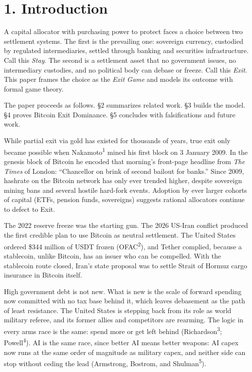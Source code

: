 \documentclass[12pt]{article}
\theoremstyle{definition}
\theoremstyle{remark}
\begin{document}
\newpage


\section{1. Introduction}

A capital allocator with purchasing power to protect faces a choice between two settlement systems. The first is the prevailing one: sovereign currency, custodied by regulated intermediaries, settled through banking and securities infrastructure. Call this \emph{Stay}. The second is a settlement asset that no government issues, no intermediary custodies, and no political body can debase or freeze. Call this \emph{Exit}. This paper frames the choice as the \emph{Exit Game} and models its outcome with formal game theory.

The paper proceeds as follows. \S2 summarizes related work. \S3 builds the model. \S4 proves Bitcoin Exit Dominance. \S5 concludes with falsifications and future work.

While partial exit via gold has existed for thousands of years, true exit only became possible when Nakamoto\textsuperscript{1} mined his first block on 3 January 2009. In the genesis block of Bitcoin he encoded that morning's front-page headline from \emph{The Times} of London: ``Chancellor on brink of second bailout for banks.'' Since 2009, hashrate on the Bitcoin network has only ever trended higher, despite sovereign mining bans and several hostile hard-fork events. Adoption by ever larger cohorts of capital (ETFs, pension funds, sovereigns) suggests rational allocators continue to defect to Exit.

The 2022 reserve freeze was the starting gun. The 2026 US-Iran conflict produced the first credible plan to use Bitcoin as neutral settlement. The United States ordered \$344 million of USDT frozen (OFAC\textsuperscript{2}), and Tether complied, because a stablecoin, unlike Bitcoin, has an issuer who can be compelled. With the stablecoin route closed, Iran's state proposal was to settle Strait of Hormuz cargo insurance in Bitcoin itself.

High government debt is not new. What is new is the scale of forward spending now committed with no tax base behind it, which leaves debasement as the path of least resistance. The United States is stepping back from its role as world military referee, and its former allies and competitors are rearming. The logic in every arms race is the same: spend more or get left behind (Richardson\textsuperscript{3}; Powell\textsuperscript{4}). AI is the same race, since better AI means better weapons: AI capex now runs at the same order of magnitude as military capex, and neither side can stop without ceding the lead (Armstrong, Bostrom, and Shulman\textsuperscript{5}).
\end{document}
